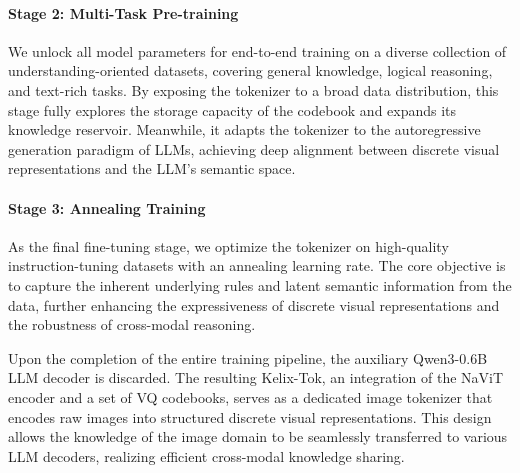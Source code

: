 \documentclass[11pt, a4paper, logo, copyright]{googledeepmind}
\begin{document}
\paragraph{Stage 2: Multi-Task Pre-training} %
We unlock all model parameters for end-to-end training on a diverse collection of understanding-oriented datasets, covering general knowledge, logical reasoning, and text-rich tasks. By exposing the tokenizer to a broad data distribution, this stage fully explores the storage capacity of the codebook and expands its knowledge reservoir. Meanwhile, it adapts the tokenizer to the autoregressive generation paradigm of LLMs, achieving deep alignment between discrete visual representations and the LLM's semantic space.

\paragraph{Stage 3: Annealing Training} %
As the final fine-tuning stage, we optimize the tokenizer on high-quality instruction-tuning datasets with an annealing learning rate. The core objective is to capture the inherent underlying rules and latent semantic information from the data, further enhancing the expressiveness of discrete visual representations and the robustness of cross-modal reasoning.

Upon the completion of the entire training pipeline, the auxiliary Qwen3-0.6B LLM decoder is discarded. The resulting Kelix-Tok, an integration of the NaViT encoder and a set of VQ codebooks, serves as a dedicated image tokenizer that encodes raw images into structured discrete visual representations. This design allows the knowledge of the image domain to be seamlessly transferred to various LLM decoders, realizing efficient cross-modal knowledge sharing. %
\end{document}
